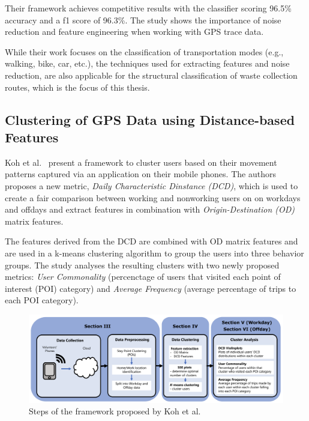 \documentclass[a4paper,12pt,twoside]{scrreprt}
\begin{document}
Their framework achieves competitive results with the
classifier scoring 96.5\% accuracy and a f1 score of 96.3\%. The study shows
the
importance of noise reduction and feature engineering when working with GPS
trace data.~\cite{etemad_predicting_2018}

While their work focuses on the classification of transportation modes (e.g.,
walking, bike, car, etc.), the techniques used for extracting features and
noise reduction, are also applicable for the structural classification of waste
collection routes, which is the focus of this thesis.

\subsection{Clustering of GPS Data using Distance-based Features}
Koh et al.~\cite{koh_clustering_2022} present a framework to cluster users
based on their movement patterns captured via an application on their mobile
phones.
The authors proposes a new metric, \textit{Daily Characteristic Dinstance
  (DCD)},
which is used to create a fair comparison between working and nonworking users
on on workdays and offdays and extract features in combination with
\textit{Origin-Destination (OD)} matrix features.

The features derived from the DCD are combined with OD matrix
features
and are used in a k-means clustering algorithm to group the users into three
behavior groups. The study analyses the resulting clusters with two newly
proposed
metrics: \textit{User Commonality} (percenctage of users that visited each
point of interest (POI) category) and \textit{Average Frequency} (average
percentage of trips to each POI category).~\cite{koh_clustering_2022}

\begin{figure}[htbp]
  \centering

  \includegraphics[width=\textwidth]{Figures/related_work/koh_clustering_framwork_flowchart.png}
  \caption{Steps of the framework proposed by Koh et
    al.~\cite{koh_clustering_2022}}
  \label{fig:koh_clustering_framework}
\end{figure}
\FloatBarrier
\end{document}
